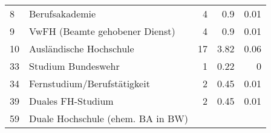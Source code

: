 \begin{longtable}{lXrrr}
     8 &
     \multicolumn{1}{X}{ Berufsakademie   } &


       \num{4} &
       \num[round-mode=places,round-precision=2]{0,9} &
         \num[round-mode=places,round-precision=2]{0,01} \\

     9 &
     \multicolumn{1}{X}{ VwFH (Beamte gehobener Dienst)   } &


       \num{4} &
       \num[round-mode=places,round-precision=2]{0,9} &
         \num[round-mode=places,round-precision=2]{0,01} \\

     10 &
     \multicolumn{1}{X}{ Ausländische Hochschule   } &


       \num{17} &
       \num[round-mode=places,round-precision=2]{3,82} &
         \num[round-mode=places,round-precision=2]{0,06} \\

     33 &
     \multicolumn{1}{X}{ Studium Bundeswehr   } &


       \num{1} &
       \num[round-mode=places,round-precision=2]{0,22} &
         \num[round-mode=places,round-precision=2]{0} \\

     34 &
     \multicolumn{1}{X}{ Fernstudium/Berufstätigkeit   } &


       \num{2} &
       \num[round-mode=places,round-precision=2]{0,45} &
         \num[round-mode=places,round-precision=2]{0,01} \\

     39 &
     \multicolumn{1}{X}{ Duales FH-Studium   } &


       \num{2} &
       \num[round-mode=places,round-precision=2]{0,45} &
         \num[round-mode=places,round-precision=2]{0,01} \\

     59 &
     \multicolumn{1}{X}{ Duale Hochschule (ehem. BA in BW)   } &



\end{longtable}
